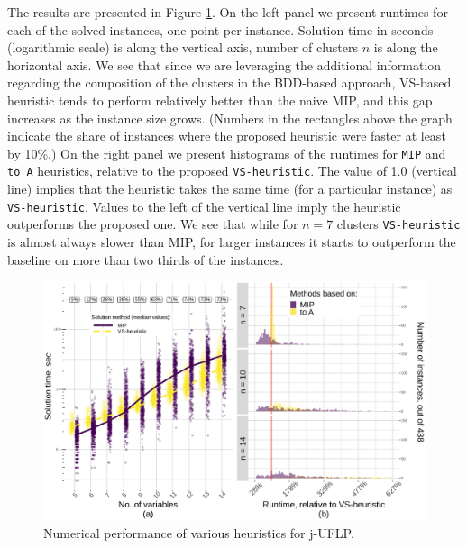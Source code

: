\documentclass[11pt]{article}
\begin{document}
The results are presented in Figure \ref{fig:jUFLP-nums}. On the left panel we
present runtimes for each of the solved instances, one point per instance.
Solution time in seconds (logarithmic scale) is along the vertical axis, number
of clusters \(n\) is along the horizontal axis. We see that since we are
leveraging the additional information regarding the composition of the clusters
in the BDD-based approach, VS-based heuristic tends to perform relatively better
than the naive MIP, and this gap increases as the instance size grows. (Numbers
in the rectangles above the graph indicate the share of instances where the
proposed heuristic were faster at least by 10\%.) On the right panel we present
histograms of the runtimes for \texttt{MIP} and \texttt{to A} heuristics, relative to the
proposed \texttt{VS-heuristic}. The value of 1.0 (vertical line) implies that the
heuristic takes the same time (for a particular instance) as \texttt{VS-heuristic}.
Values to the left of the vertical line imply the heuristic outperforms the
proposed one. We see that while for \(n=7\) clusters \texttt{VS-heuristic} is almost
always slower than MIP, for larger instances it starts to outperform the
baseline on more than two thirds of the instances.

  \begin{figure}%
    \centering
    \includegraphics[width=\textwidth]{./jUFLP.eps}%
    \caption{Numerical performance of various heuristics for j-UFLP.}%
    \label{fig:jUFLP-nums}%
\end{figure}

\printbibliography
\end{document}
